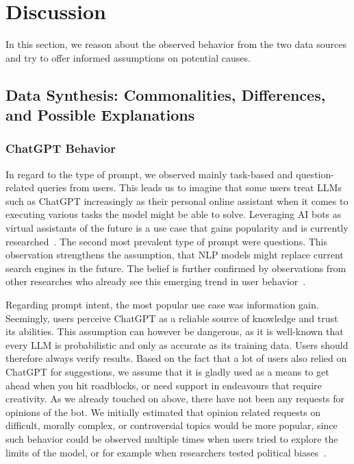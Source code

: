 \section{Discussion}
\label{sec:discussion}
In this section, we reason about the observed behavior from the two data sources and try to offer
informed assumptions on potential causes.


\subsection{Data Synthesis: Commonalities, Differences, and Possible Explanations}
\label{subsec:data-synthesis:-commonalities-differences-and-possible-explanations}

\subsubsection{ChatGPT Behavior}
In regard to the type of prompt, we observed mainly task-based and question-related queries from
users.
This leads us to imagine that some users treat LLMs such as ChatGPT increasingly as their
personal online assistant when it comes to executing various tasks the model might be able to solve.
Leveraging AI bots as virtual assistants of the future is a use case that gains popularity and is
currently researched~\cite{eshghie_chatgpt_2023}.
The second most prevalent type of prompt were questions.
This observation strengthens the assumption, that NLP models might replace current search engines
in the future.
The belief is further confirmed by observations from other researches who already see this
emerging trend in user behavior~\cite{van_bulck_what_2023}.

Regarding prompt intent, the most popular use case was information gain.
Seemingly, users perceive ChatGPT as a reliable source of knowledge and trust its abilities.
This assumption can however be dangerous, as it is well-known that every LLM is probabilistic and
only as accurate as its training data.
Users should therefore always verify results.
Based on the fact that a lot of users also relied on ChatGPT for suggestions, we assume that it
is gladly used as a means to get ahead when you hit roadblocks, or need support in endeavours
that require creativity.
As we already touched on above, there have not been any requests for opinions of the bot.
We initially estimated that opinion related requests on difficult, morally complex, or
controversial topics would be more popular, since such behavior could be observed multiple times
when users tried to explore the limits of the model, or for example when researchers tested
political biases~\cite{rozado_political_2023}.

